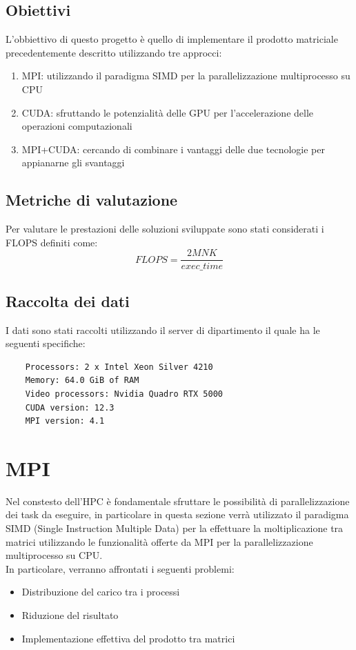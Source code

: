 \documentclass[conference]{IEEEtran}
\begin{document}
\subsection{Obiettivi}
L'obbiettivo di questo progetto è quello di implementare il prodotto matriciale precedentemente descritto utilizzando tre approcci:
\begin{enumerate}
    \item MPI: utilizzando il paradigma SIMD per la parallelizzazione multiprocesso su CPU
    \item CUDA: sfruttando le potenzialità delle GPU per l'accelerazione delle operazioni computazionali
    \item MPI+CUDA: cercando di combinare i vantaggi delle due tecnologie per appianarne gli svantaggi
\end{enumerate}
\subsection{Metriche di valutazione}
Per valutare le prestazioni delle soluzioni sviluppate sono stati considerati i FLOPS definiti come:
\begin{equation}
    FLOPS = \frac{2MNK}{exec\_time}
\end{equation}
\subsection{Raccolta dei dati}
I dati sono stati raccolti utilizzando il server di dipartimento il quale ha le seguenti specifiche:
\begin{verbatim}
    Processors: 2 x Intel Xeon Silver 4210
    Memory: 64.0 GiB of RAM
    Video processors: Nvidia Quadro RTX 5000
    CUDA version: 12.3
    MPI version: 4.1
\end{verbatim}
\section{MPI}
Nel constesto dell'HPC è fondamentale sfruttare le possibilità di parallelizzazione dei task da eseguire, in particolare in questa sezione verrà utilizzato il paradigma SIMD (Single Instruction Multiple Data) per la effettuare la moltiplicazione tra matrici utilizzando le funzionalità offerte da MPI per la parallelizzazione multiprocesso su CPU.\\ In particolare, verranno affrontati i seguenti problemi:
\begin{itemize}
    \item Distribuzione del carico tra i processi
    \item Riduzione del risultato
    \item Implementazione effettiva del prodotto tra matrici
\end{itemize}
\end{document}
